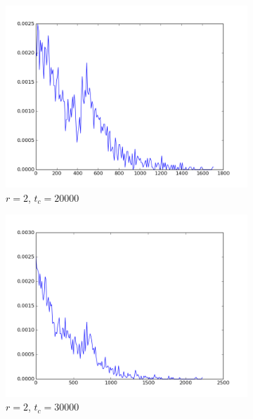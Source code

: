 \documentclass[a4paper]{article}
\begin{document}
\begin{figure}[h!]
\centering
\begin{subfigure}[b]{0.49\textwidth}
	\includegraphics[width=\textwidth]{figure_2_20000.png}
	\caption{$r = 2$, $t_c = 20000$}
\end{subfigure}
\begin{subfigure}[b]{0.49\textwidth}
	\includegraphics[width=\textwidth]{figure_2_30000.png}
	\caption{$r = 2$, $t_c = 30000$}
\end{subfigure}
\begin{subfigure}[b]{0.49\textwidth}

\end{subfigure}
\end{figure}
\end{document}
